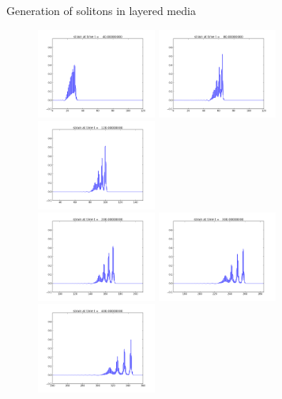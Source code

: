 \documentclass{beamer}
\begin{document}
\begin{frame}{Generation of solitons in layered media}
\begin{figure}
  \includegraphics[width=0.35\textwidth]{frame0004fig1.png}
  \includegraphics[width=0.35\textwidth]{frame0008fig1.png}
  \includegraphics[width=0.35\textwidth]{frame0012fig1.png}\\
  \includegraphics[width=0.35\textwidth]{frame0020fig1.png}
  \includegraphics[width=0.35\textwidth]{frame0030fig1.png}
  \includegraphics[width=0.35\textwidth]{frame0040fig1.png}
\end{figure}
\end{frame}
\end{document}
